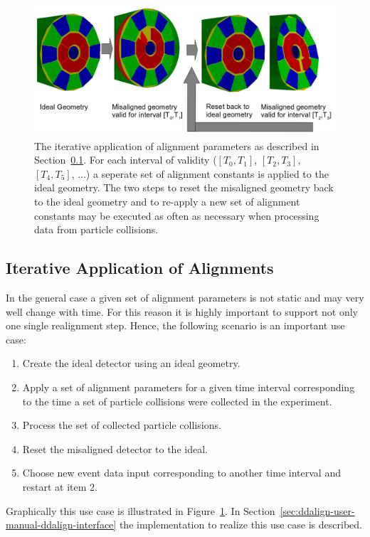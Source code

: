 \documentclass[10pt,a4paper]{article}
\begin{document}
\begin{figure}[t]
  \begin{center}
    \includegraphics[width=160mm] {DDAlign-iterative-misalignment.png}
    \caption{The iterative application of alignment parameters as described
    in Section~\ref{subsect:ddalign-intro-iterative-alignments}.
    For each interval of validity ($[T_0,T_1]$, $[T_2,T_3]$, $[T_4,T_5]$, ...)
    a seperate set of alignment constants is applied to the ideal geometry.
    The two steps to reset the misaligned geometry back to the ideal geometry and
    to re-apply a new set of alignment constants may be executed as 
    often as necessary when processing data from particle collisions.}
    \label{fig:ddalign-aligned-iterative}
  \end{center}
\end{figure}

\subsection{Iterative Application of Alignments}
\label{subsect:ddalign-intro-iterative-alignments}
\noindent
In the general case a given set of alignment parameters is not static and 
may very well change with time. For this reason it is highly important to 
support not only one single realignment step.
Hence, the following scenario is an important use case:
\begin{enumerate}\itemcompact
\item Create the ideal detector using an ideal geometry.
\item Apply a set of alignment parameters for a given time 
    interval corresponding to the 
    time a set of particle collisions were collected in the experiment.
\item Process the set of collected particle collisions.
\item Reset the misaligned detector to the ideal.
\item Choose new event data input corresponding to another time interval
    and restart at item 2.
\end{enumerate}
Graphically this use case is illustrated in 
Figure~\ref{fig:ddalign-aligned-iterative}. In 
Section~\ref{sec:ddalign-user-manual-ddalign-interface} the implementation 
to realize this use case is described.
\end{document}
